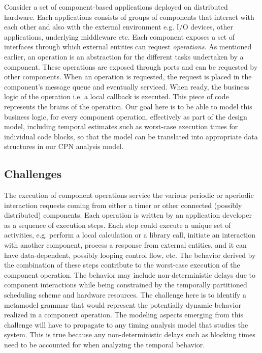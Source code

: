 Consider a set of component-based applications deployed on distributed hardware. Each applications consists of groups of components that interact with each other and also with the external environment e.g. I/O devices, other applications, underlying middleware etc. Each component exposes a set of interfaces through which external entities can request \emph{operations}. As mentioned earlier, an operation is an abstraction for the different tasks undertaken by a component. These operations are exposed through ports and can be requested by other components. When an operation is requested, the request is placed in the component's message queue and eventually serviced. When ready, the business logic of the operation i.e. a local callback is executed. This piece of code represents the brains of the operation. Our goal here is to be able to model this business logic, for every component operation, effectively as part of the design model, including temporal estimates such as worst-case execution times for individual code blocks, so that the model can be translated into appropriate data structures in our CPN analysis model.

\subsection{Challenges}

The execution of component operations service the various periodic or aperiodic interaction requests coming from either a timer or other connected (possibly distributed) components. Each operation is written by an application developer as a sequence of execution steps. Each step could execute a unique set of activities, e.g. perform a local calculation or a library call, initiate an interaction with another component, process a response from external entities, and it can have data-dependent, possibly looping control flow, etc. The behavior derived by the combination of these steps contribute to the worst-case execution of the component operation. The behavior may include non-deterministic delays due to component interactions while being constrained by the temporally partitioned scheduling scheme and hardware resources. The challenge here is to identify a metamodel grammar that would represent the potentially dynamic behavior realized in a component operation. The modeling aspects emerging from this challenge will have to propagate to any timing analysis model that studies the system. This is true because any non-deterministic delays such as blocking times need to be accounted for when analyzing the temporal behavior.

